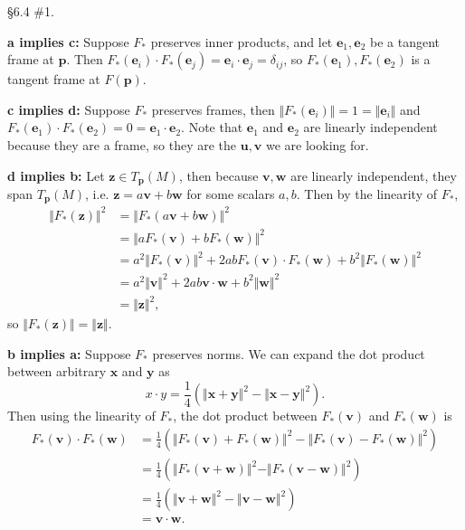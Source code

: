 \documentclass[10pt]{report}
\begin{document}
\begin{exer}[]
\S 6.4 \#1.
\end{exer}
\textbf{a implies c:} Suppose $F_{*}$ preserves inner products, and let $\mathbf{e}_1,\mathbf{e}_2$ be a tangent frame at $\mathbf{p}$. Then $F_{*}(\mathbf{e}_i)\cdot F_{*}(\mathbf{e}_{j})=\mathbf{e}_{i}\cdot \mathbf{e}_{j}=\delta_{ij}$, so $F_{*}(\mathbf{e}_{1}), F_{*}(\mathbf{e}_{2})$ is a tangent frame at $F({\mathbf{p}})$.

\textbf{c implies d:} Suppose $F_{*}$ preserves frames, then ${\Vert{F_{*}(\mathbf{e}_i)}\Vert}=1={\Vert{\mathbf{e}_i}\Vert}$ and $F_{*}(\mathbf{e}_{1})\cdot F_{*}(\mathbf{e}_{2})=0=\mathbf{e}_{1}\cdot \mathbf{e}_{2}$. Note that $\mathbf{e}_1$ and $\mathbf{e}_2$ are linearly independent because they are a frame, so they are the $\mathbf{u},\mathbf{v}$ we are looking for.

\textbf{d implies b:} Let $\mathbf{z} \in T_{\mathbf{p}}(M)$, then because $\mathbf{v},\mathbf{w}$ are linearly independent, they span $T_{\mathbf{p}}(M)$, i.e. $\mathbf{z} = a\mathbf{v}+b\mathbf{w}$ for some scalars $a,b$. Then by the linearity of $F_{*}$,
\begin{align*}
	{\Vert{F_{*}(\mathbf{z})}\Vert}^2&= {\Vert{F_{*}(a\mathbf{v}+b\mathbf{w})}\Vert}^2 \\
				       &= {\Vert{aF_{*}(\mathbf{v})+bF_{*}(\mathbf{w})}\Vert}^2 \\
				       &= a^2{\Vert{F_{*}(\mathbf{v})}\Vert}^2+2abF_{*}(\mathbf{v})\cdot F_{*}(\mathbf{w})+b^2{\Vert{F_{*}(\mathbf{w})}\Vert}^2 \\
				       &= a^2{\Vert{\mathbf{v}}\Vert}^2 + 2ab\mathbf{v}\cdot\mathbf{w}+b^2{\Vert{\mathbf{w}}\Vert}^2 \\
				       &= {\Vert{\mathbf{z}}\Vert}^2,
\end{align*}
so ${\Vert{F_{*}(\mathbf{z})}\Vert}={\Vert{\mathbf{z}}\Vert}$.

\textbf{b implies a:} Suppose $F_{*}$ preserves norms. We can expand the dot product between arbitrary $\mathbf{x}$ and $\mathbf{y}$ as
\[
	x\cdot y = \frac{1}{4} \left( {\Vert{\mathbf{x}+\mathbf{y}}\Vert}^2-{\Vert{\mathbf{x}-\mathbf{y}}\Vert}^2 \right).
\] Then using the linearity of $F_{*}$, the dot product between $F_{*}(\mathbf{v})$ and $F_{*}(\mathbf{w})$ is
\begin{align*}
	F_{*}(\mathbf{v})\cdot F_{*}(\mathbf{w}) &= \frac{1}{4} \left( {\Vert{F_{*}(\mathbf{v})+F_{*}(\mathbf{w})}\Vert}^2-{\Vert{F_{*}(\mathbf{v})-F_{*}(\mathbf{w})}\Vert}^2 \right) \\
						 &= \frac{1}{4} \left( {\Vert{F_{*}(\mathbf{v}+\mathbf{w})}\Vert}^2-\Vert F_{*}(\mathbf{v}-\mathbf{w})\Vert^2 \right) \\
						 &= \frac{1}{4} \left( {\Vert{\mathbf{v}+\mathbf{w}}\Vert}^2-{\Vert{\mathbf{v}-\mathbf{w}}\Vert}^2 \right) \\
						 &= \mathbf{v} \cdot \mathbf{w}.
\end{align*}
\end{document}
